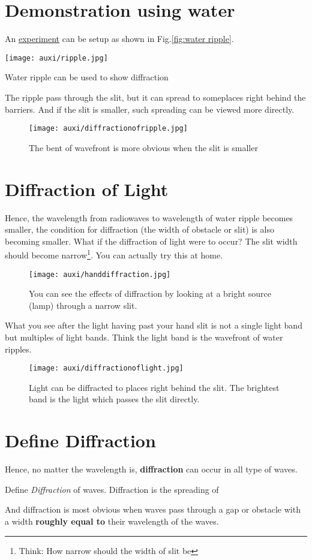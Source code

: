 \documentclass[a4paper]{tufte-handout}
\newenvironment{SummBox}
{\begin{tcolorbox}[breakable,colback=r1!30,colframe=r1,title=Summary]} {\end{tcolorbox}}
\begin{document}
\section{Demonstration using water}
An \href{https://phet.colorado.edu/sims/html/wave-interference/latest/wave-interference_en.html}{experiment} can be setup as shown in Fig.\ref{fig:water ripple}.
\begin{marginfigure}
\texttt{[image: auxi/ripple.jpg]}
\caption{Water ripple can be used to show diffraction}
\label{fig:water ripple}
\end{marginfigure}
The ripple pass through the slit, but it can spread to someplaces right behind the barriers. 
And if the slit is smaller, such spreading can be viewed more directly.
\begin{figure}[h]
\centering
\texttt{[image: auxi/diffractionofripple.jpg]}
\caption{The bent of wavefront is more obvious when the slit is smaller}
\label{fig:diffraction of waves}
\end{figure}

\section{Diffraction of Light}
Hence, the wavelength from radiowaves to wavelength of water ripple becomes smaller, the condition for diffraction (the width of obstacle or slit) is also becoming smaller. What if the diffraction of light were to occur? The slit width should become narrow\footnote{Think: How narrow should the width of slit be}. You can actually try this at home.
\begin{figure}[h]
\centering
\texttt{[image: auxi/handdiffraction.jpg]}
\caption{You can see the effects of diffraction by looking at a bright source (lamp) through a narrow slit.}
\label{fig:hand diffraction}
\end{figure}
What you see after the light having past your hand slit is not a single light band but multiples of light bands. Think the light band is the wavefront of water ripples.

\begin{figure}[h]
\centering
\texttt{[image: auxi/diffractionoflight.jpg]}
\caption{Light can be diffracted to places right behind the slit. The brightest band is the light which passes the slit directly.}
\label{fig:diffraction of light}
\end{figure}

\section{Define Diffraction}
Hence, no matter the wavelength is, \textbf{diffraction} can occur in all type of waves.
\begin{SummBox}
Define \emph{Diffraction} of waves.
\tcblower
Diffraction is the spreading of 
\vspace{6ex}
\end{SummBox}
And diffraction is most obvious when waves pass through a gap or obstacle with a width \textbf{roughly equal to} their wavelength of the waves.
\end{document}
